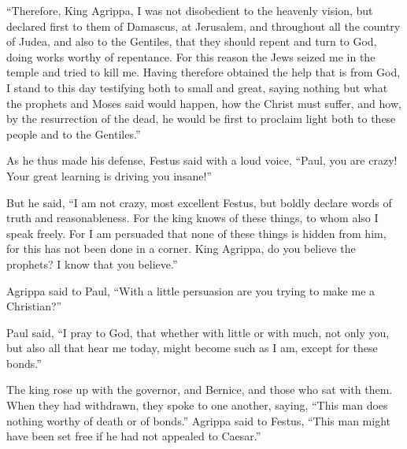{{{}}
\par }{\PP {}“Therefore, King Agrippa, I was not disobedient to the heavenly vision,
but declared first to them of Damascus, at Jerusalem, and throughout all the country of Judea, and also to the Gentiles, that they should repent and turn to God, doing works worthy of repentance.
For this reason the Jews seized me in the temple and tried to kill me.
Having therefore obtained the help that is from God, I stand to this day testifying both to small and great, saying nothing but what the prophets and Moses said would happen,
how the Christ must suffer, and how, by the resurrection of the dead, he would be first to proclaim light both to these people and to the Gentiles.”
\par }{\PP {}As he thus made his defense, Festus said with a loud voice, “Paul, you are crazy! Your great learning is driving you insane!”
\par }{\PP {}But he said, “I am not crazy, most excellent Festus, but boldly declare words of truth and reasonableness.
For the king knows of these things, to whom also I speak freely. For I am persuaded that none of these things is hidden from him, for this has not been done in a corner.
King Agrippa, do you believe the prophets? I know that you believe.”
\par }{\PP {}Agrippa said to Paul, “With a little persuasion are you trying to make me a Christian?”
\par }{\PP {}Paul said, “I pray to God, that whether with little or with much, not only you, but also all that hear me today, might become such as I am, except for these bonds.”
\par }{\PP {}The king rose up with the governor, and Bernice, and those who sat with them.
When they had withdrawn, they spoke to one another, saying, “This man does nothing worthy of death or of bonds.”
Agrippa said to Festus, “This man might have been set free if he had not appealed to Caesar.”

}

